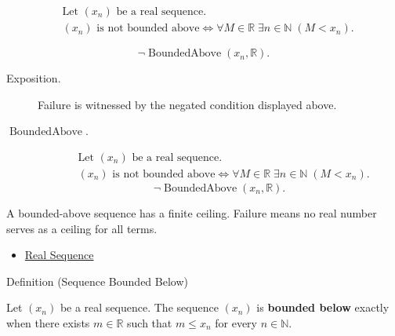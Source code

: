 \begin{remark*}
\[
\begin{aligned}
&\text{Let } (x_n) \text{ be a real sequence.}\\
&(x_n) \text{ is not bounded above}
\Longleftrightarrow
\forall M \in \mathbb{R}\;
\exists n \in \mathbb{N}\;(M < x_n).
\end{aligned}
\]
\end{remark*}

\begin{remark*}
\[
\neg\operatorname{BoundedAbove}(x_n,\mathbb{R}).
\]
\end{remark*}
\begin{remark*}
\begin{description}
  \item[Exposition.]
Failure is witnessed by the negated condition displayed above.
  \item[\(\operatorname{BoundedAbove}.\)]
\[
\begin{aligned}
&\text{Let } (x_n) \text{ be a real sequence.}\\
&(x_n) \text{ is not bounded above}
\Longleftrightarrow
\forall M \in \mathbb{R}\;
\exists n \in \mathbb{N}\;(M < x_n).
\end{aligned}
\]
\[
\neg\operatorname{BoundedAbove}(x_n,\mathbb{R}).
\]
\end{description}
\end{remark*}

\begin{remark*}[Interpretation]
A bounded-above sequence has a finite ceiling. Failure means no real number
serves as a ceiling for all terms.
\end{remark*}

\begin{dependencies}
\begin{itemize}
  \item \hyperref[def:real-sequence]{Real Sequence}
\end{itemize}
\end{dependencies}


\begin{definitionbox}{Definition (Sequence Bounded Below)}
\begin{definition}
\label{def:sequence-bounded-below}
Let $(x_n)$ be a real sequence. The sequence $(x_n)$ is
\textbf{bounded below} exactly when there exists $m \in \mathbb{R}$ such
that $m \le x_n$ for every $n \in \mathbb{N}$.
\end{definition}
\end{definitionbox}

